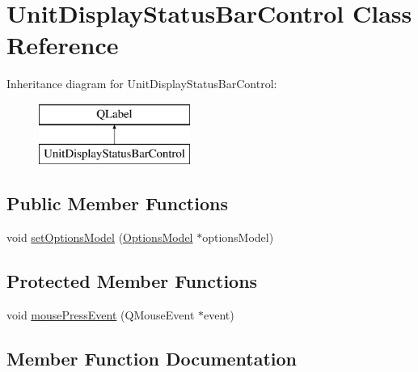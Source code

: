 \hypertarget{class_unit_display_status_bar_control}{}\section{Unit\+Display\+Status\+Bar\+Control Class Reference}
\label{class_unit_display_status_bar_control}
Inheritance diagram for Unit\+Display\+Status\+Bar\+Control\+:\begin{figure}[H]
\begin{center}
\leavevmode
\includegraphics[height=2.000000cm]{class_unit_display_status_bar_control}
\end{center}
\end{figure}
\subsection*{Public Member Functions}
\begin{DoxyCompactItemize}
\item 
void \mbox{\hyperlink{class_unit_display_status_bar_control_ac8d2a43f66f3f71c7d6926dbd5927066}{set\+Options\+Model}} (\mbox{\hyperlink{class_options_model}{Options\+Model}} $\ast$options\+Model)
\end{DoxyCompactItemize}
\subsection*{Protected Member Functions}
\begin{DoxyCompactItemize}
\item 
void \mbox{\hyperlink{class_unit_display_status_bar_control_a645cb0f2a435881ca9cc5ac09355cff0}{mouse\+Press\+Event}} (Q\+Mouse\+Event $\ast$event)
\end{DoxyCompactItemize}


\subsection{Member Function Documentation}
\mbox{\label{class_unit_display_status_bar_control_a645cb0f2a435881ca9cc5ac09355cff0}} 
